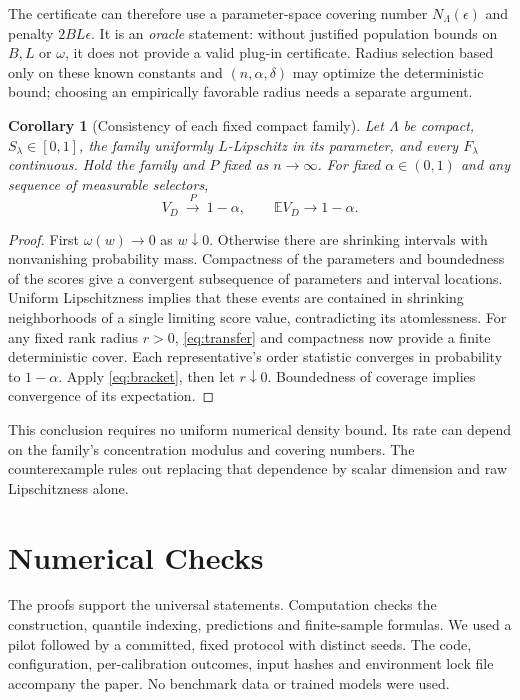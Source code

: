 \documentclass{article}
\newtheorem{corollary}[theorem]{Corollary}
\newcommand{\EE}{\mathbb E}
\begin{document}
The certificate can therefore use a parameter-space covering number $N_\Lambda(\epsilon)$ and penalty $2BL\epsilon$. It is an \emph{oracle} statement: without justified population bounds on $B,L$ or $\omega$, it does not provide a valid plug-in certificate. Radius selection based only on these known constants and $(n,\alpha,\delta)$ may optimize the deterministic bound; choosing an empirically favorable radius needs a separate argument.

\begin{corollary}[Consistency of each fixed compact family]\label{cor:consistency}
Let $\Lambda$ be compact, $S_\lambda\in[0,1]$, the family uniformly $L$-Lipschitz in its parameter, and every $F_\lambda$ continuous. Hold the family and $P$ fixed as $n\to\infty$. For fixed $\alpha\in(0,1)$ and any sequence of measurable selectors,
\begin{equation}
 V_D\ \xrightarrow{P}\ 1-\alpha,\qquad \EE V_D\to1-\alpha.
\end{equation}
\end{corollary}

\begin{proof}
First $\omega(w)\to0$ as $w\downarrow0$. Otherwise there are shrinking intervals with nonvanishing probability mass. Compactness of the parameters and boundedness of the scores give a convergent subsequence of parameters and interval locations. Uniform Lipschitzness implies that these events are contained in shrinking neighborhoods of a single limiting score value, contradicting its atomlessness. For any fixed rank radius $r>0$, \cref{eq:transfer} and compactness now provide a finite deterministic cover. Each representative's order statistic converges in probability to $1-\alpha$. Apply \cref{eq:bracket}, then let $r\downarrow0$. Boundedness of coverage implies convergence of its expectation.
\end{proof}

This conclusion requires no uniform numerical density bound. Its rate can depend on the family's concentration modulus and covering numbers. The counterexample rules out replacing that dependence by scalar dimension and raw Lipschitzness alone.

\section{Numerical Checks}

The proofs support the universal statements. Computation checks the construction, quantile indexing, predictions and finite-sample formulas. We used a pilot followed by a committed, fixed protocol with distinct seeds. The code, configuration, per-calibration outcomes, input hashes and environment lock file accompany the paper. No benchmark data or trained models were used.
\end{document}
